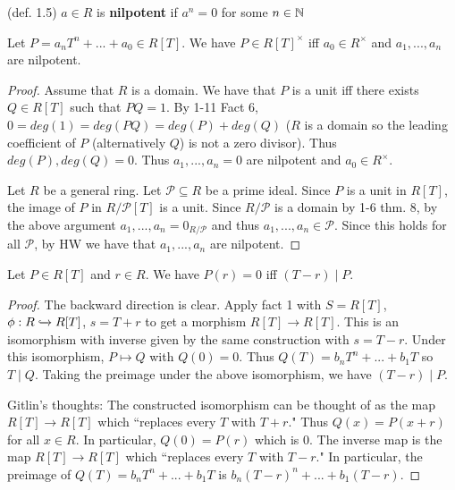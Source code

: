 \begin{rmk} (def. 1.5)
$a \in R$ is \textbf{nilpotent} if $a^n = 0$ for some $n \in \mathbb{N}$
\end{rmk}

\begin{prop}
Let $P = a_nT^n + ... + a_0 \in R[T]$.  We have $P \in R[T]^\times$ iff $a_0 \in R^\times$ and $a_1,...,a_n$ are nilpotent.
\end{prop}

\begin{proof} \hspace{0.5cm}

Assume that $R$ is a domain.  We have that $P$ is a unit iff there exists $Q \in R[T]$ such that $PQ = 1$.  By 1-11 Fact 6, $0 = deg(1) = deg(PQ) = deg(P) + deg(Q)$ ($R$ is a domain so the leading coefficient of $P$ (alternatively $Q$) is not a zero divisor).  Thus $deg(P),deg(Q) = 0$.  Thus $a_1,...,a_n = 0$ are nilpotent and $a_0 \in R^\times$.

Let $R$ be a general ring.  Let $\mathcal{P} \subseteq R$ be a prime ideal.  Since $P$ is a unit in $R[T]$, the image of $P$ in $R / \mathcal{P}[T]$ is a unit.  Since $R/\mathcal{P}$ is a domain by 1-6 thm. 8, by the above argument $a_1,...,a_n = 0_{R/\mathcal{P}}$ and thus $a_1,...,a_n \in \mathcal{P}$.  Since this holds for all $\mathcal{P}$, by HW we have that $a_1,...,a_n$ are nilpotent.

\end{proof}

\begin{lemma}\label{lemma:polyroot}
Let $P \in R[T]$ and $r \in R$.  We have $P(r) = 0$ iff $(T-r) \mid P$.
\end{lemma}

\begin{proof}

The backward direction is clear.  Apply fact 1 with $S = R[T]$, $\phi : R \xhookrightarrow{} R[T]$, $s = T+r$ to get a morphism $R[T] \rightarrow R[T]$.  This is an isomorphism with inverse given by the same construction with $s = T-r$.  Under this isomorphism, $P \mapsto Q$ with $Q(0) = 0$.  Thus $Q(T) = b_nT^n + ... + b_1T$ so $T \mid Q$.  Taking the preimage under the above isomorphism, we have $(T-r) \mid P$.

Gitlin's thoughts:  The constructed isomorphism can be thought of as the map $R[T] \rightarrow R[T]$ which ``replaces every $T$ with $T+r$."  Thus $Q(x) = P(x+r)$ for all $x \in R$.  In particular, $Q(0) = P(r)$ which is $0$.  The inverse map is the map $R[T] \rightarrow R[T]$ which ``replaces every $T$ with $T-r$."  In particular, the preimage of $Q(T) = b_nT^n + ... + b_1T$ is $b_n(T-r)^n + ... + b_1(T-r)$.

\end{proof}

